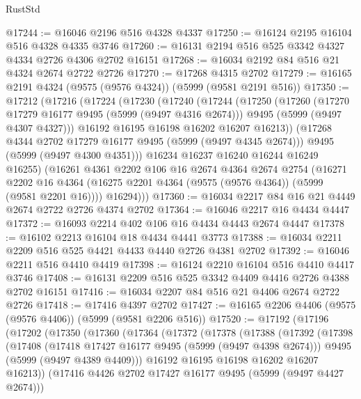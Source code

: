 \begin{lexlean}{RustStd}
\begin{coremodule}
@17244 := @16046 @2196 @516 @4328 @4337
@17250 := @16124 @2195 @16104 @516 @4328 @4335 @3746
@17260 := @16131 @2194 @516 @525 @3342 @4327 @4334 @2726 @4306 @2702 @16151
@17268 := @16034 @2192 @84 @516 @21 @4324 @2674 @2722 @2726
@17270 := @17268 @4315 @2702
@17279 := @16165 @2191 @4324 (@9575 (@9576 @4324)) (@5999 (@9581 @2191 @516))
@17350 := @17212
    (@17216
      (@17224
        (@17230
          (@17240
            (@17244
              (@17250
                (@17260
                  (@17270 @17279 @16177 @9495 (@5999 (@9497 @4316 @2674)))
                  @9495
                  (@5999 (@9497 @4307 @4327)))
                @16192
                @16195
                @16198
                @16202
                @16207
                @16213))
            (@17268 @4344 @2702 @17279 @16177 @9495 (@5999 (@9497 @4345 @2674)))
            @9495
            (@5999 (@9497 @4300 @4351)))
          @16234
          @16237
          @16240
          @16244
          @16249
          @16255)
        (@16261
          @4361
          @2202
          @106
          @16
          @2674
          @4364
          @2674
          @2754
          (@16271
            @2202
            @16
            @4364
            (@16275 @2201 @4364 (@9575 (@9576 @4364)) (@5999 (@9581 @2201 @16))))
          @16294)))
@17360 := @16034 @2217 @84 @16 @21 @4449 @2674 @2722 @2726 @4374 @2702
@17364 := @16046 @2217 @16 @4434 @4447
@17372 := @16093 @2214 @402 @106 @16 @4434 @4443 @2674 @4447
@17378 := @16102 @2213 @16104 @18 @4434 @4441 @3773
@17388 := @16034 @2211 @2209 @516 @525 @4421 @4433 @4440 @2726 @4381 @2702
@17392 := @16046 @2211 @516 @4410 @4419
@17398 := @16124 @2210 @16104 @516 @4410 @4417 @3746
@17408 := @16131 @2209 @516 @525 @3342 @4409 @4416 @2726 @4388 @2702 @16151
@17416 := @16034 @2207 @84 @516 @21 @4406 @2674 @2722 @2726
@17418 := @17416 @4397 @2702
@17427 := @16165 @2206 @4406 (@9575 (@9576 @4406)) (@5999 (@9581 @2206 @516))
@17520 := @17192
    (@17196
      (@17202
        (@17350
          (@17360
            (@17364
              (@17372
                (@17378
                  (@17388
                    (@17392
                      (@17398
                        (@17408
                          (@17418 @17427 @16177 @9495 (@5999 (@9497 @4398 @2674)))
                          @9495
                          (@5999 (@9497 @4389 @4409)))
                        @16192
                        @16195
                        @16198
                        @16202
                        @16207
                        @16213))
                    (@17416 @4426 @2702 @17427 @16177 @9495 (@5999 (@9497 @4427 @2674)))

\end{coremodule}
\end{lexlean}

